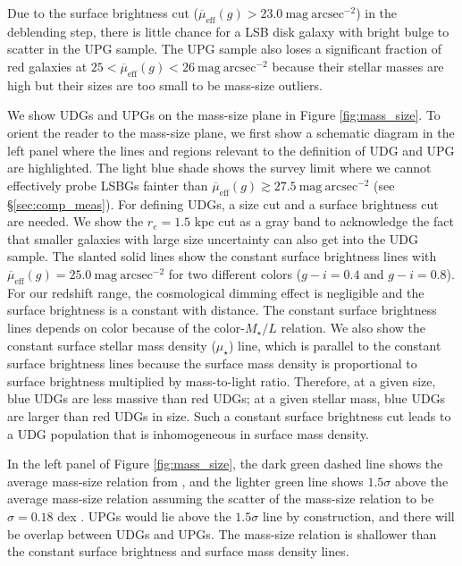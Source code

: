 \documentclass[twocolumn,astrosymb,twocolappendix]{aastex631}
\newcommand{\sbunit}{\mathrm{mag\ arcsec}^{-2}}
\newcommand{\sbeff}{\overline{\mu}_{\mathrm{eff}}(g)}
\begin{document}
\begin{CJK*}{UTF8}{gbsn}
Due to the surface brightness cut ($\sbeff > 23.0\ \sbunit$) in the deblending step, there is little chance for a LSB disk galaxy with bright bulge to scatter in the UPG sample. The UPG sample also loses a significant fraction of red galaxies at $25 < \sbeff < 26\ \sbunit$ because their stellar masses are high but their sizes are too small to be mass-size outliers. 

We show UDGs and UPGs on the mass-size plane in Figure \ref{fig:mass_size}. To orient the reader to the mass-size plane, we first show a schematic diagram in the left panel where the lines and regions relevant to the definition of UDG and UPG are highlighted. The light blue shade shows the survey limit where we cannot effectively probe LSBGs fainter than $\sbeff \gtrsim 27.5\ \sbunit$ (see \S\ref{sec:comp_meas}). 
For defining UDGs, a size cut and a surface brightness cut are needed. We show the $r_e = 1.5$ kpc cut as a gray band to acknowledge the fact that smaller galaxies with large size uncertainty can also get into the UDG sample. The slanted solid lines show the constant surface brightness lines with $\sbeff = 25.0\ \sbunit$ for two different colors ($g-i=0.4$ and $g-i=0.8$). For our redshift range, the cosmological dimming effect is negligible and the surface brightness is a constant with distance. The constant surface brightness lines depends on color because of the color-$M_\star/L$ relation. We also show the constant surface stellar mass density ($\mu_\star$) line, which is parallel to the constant surface brightness lines because the surface mass density is proportional to surface brightness multiplied by mass-to-light ratio. Therefore, at a given size, blue UDGs are less massive than red UDGs; at a given stellar mass, blue UDGs are larger than red UDGs in size. Such a constant surface brightness cut leads to a UDG population that is inhomogeneous in surface mass density. 

In the left panel of Figure \ref{fig:mass_size}, the dark green dashed line shows the average mass-size relation from \citep{ELVES-I}, and the lighter green line shows $1.5\sigma$ above the average mass-size relation assuming the scatter of the mass-size relation to be $\sigma=0.18$ dex \citep{ELVES-I}. UPGs would lie above the $1.5\sigma$ line by construction, and there will be overlap between UDGs and UPGs. The mass-size relation is shallower than the constant surface brightness and surface mass density lines.


\end{CJK*}
\end{document}
